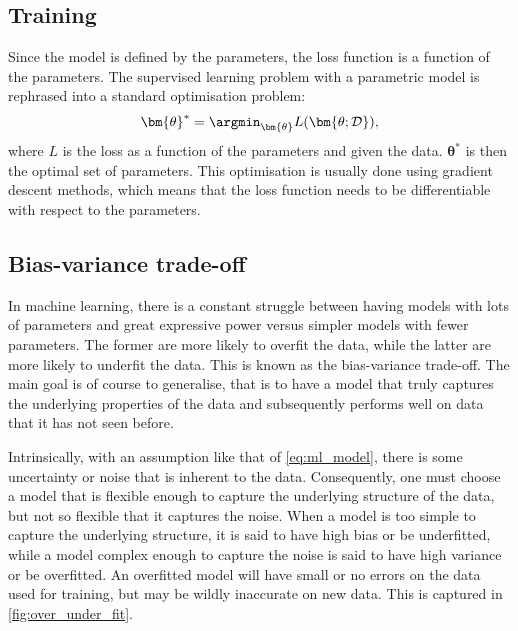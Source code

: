 \subsection{Training}
Since the model is defined by the parameters, the loss function is a function of the parameters.
The supervised learning problem with a parametric model is rephrased into a standard optimisation problem:
\begin{equation}
    \bm{\theta}^* = \argmin_{\bm{\theta}} L(\bm{\theta; \mathcal{D}}),
\end{equation}
where $L$ is the loss as a function of the parameters and given the data.
$\bm{\theta}^*$ is then the optimal set of parameters.
This optimisation is usually done using gradient descent methods, which means that the loss function needs to be differentiable with respect to the parameters.


\subsection{Bias-variance trade-off}
In machine learning, there is a constant struggle between having models with lots of parameters and great expressive power versus simpler models with fewer parameters.
The former are more likely to overfit the data, while the latter are more likely to underfit the data.
This is known as the bias-variance trade-off.
The main goal is of course to generalise, that is to have a model that truly captures the underlying properties of the data and subsequently performs well on data that it has not seen before.

Intrinsically, with an assumption like that of \cref{eq:ml_model}, there is some uncertainty or noise that is inherent to the data.
Consequently, one must choose a model that is flexible enough to capture the underlying structure of the data, but not so flexible that it captures the noise.
When a model is too simple to capture the underlying structure, it is said to have high bias or be underfitted, while a model complex enough to capture the noise is said to have high variance or be overfitted.
An overfitted model will have small or no errors on the data used for training, but may be wildly inaccurate on new data.
This is captured in \cref{fig:over_under_fit}.


